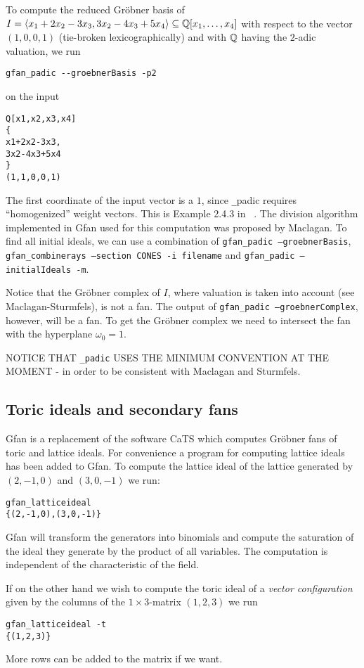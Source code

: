 \begin{example}
To compute the reduced Gr\"obner basis of $I=\langle x_1+2x_2-3x_3, 3x_2-4x_3+5x_4\rangle\subseteq \mathbb{Q}[x_1,\dots,x_4]$ with respect to the vector $(1,0,0,1)$ (tie-broken lexicographically) and with $\mathbb{Q}$ having the $2$-adic valuation,
we run
\begin{verbatim}
gfan_padic --groebnerBasis -p2
\end{verbatim}
on the input
\begin{verbatim}
Q[x1,x2,x3,x4]
{
x1+2x2-3x3,
3x2-4x3+5x4
}
(1,1,0,0,1)
\end{verbatim}
The first coordinate of the input vector is a $1$, since {\texttt \_padic} requires ``homogenized'' weight vectors. This is Example 2.4.3 in ~\cite{tropicalbook}. The division algorithm implemented in Gfan used for this computation was proposed by Maclagan. To find all initial ideals, we can use a combination of \texttt{gfan\_padic --groebnerBasis}, \texttt{gfan\_combinerays --section CONES -i filename} and \texttt{gfan\_padic --initialIdeals -m}.

Notice that the Gr\"obner complex of $I$, where valuation is taken into account (see Maclagan-Sturmfels), is not a fan. The output of \texttt{gfan\_padic --groebnerComplex}, however, will be a fan. To get the Gr\"obner complex we need to intersect the fan with the hyperplane $\omega_0=1$.

NOTICE THAT \texttt{\_padic} USES THE MINIMUM CONVENTION AT THE MOMENT - in order to be consistent with Maclagan and Sturmfels.
\end{example}


\subsection{Toric ideals and secondary fans}

Gfan is a replacement of the software CaTS \cite{cats} which computes Gr\"obner fans of toric and lattice ideals.
For convenience a program for computing lattice ideals has been added to Gfan.
To compute the lattice ideal of the lattice generated by $(2,-1,0)$ and $(3,0,-1)$ we run:
\begin{verbatim}
gfan_latticeideal
{(2,-1,0),(3,0,-1)}
\end{verbatim}
Gfan will transform the generators into binomials and compute the
saturation of the ideal they generate by the product of all variables. The computation is independent of the characteristic of the field.

If on the other hand we wish to compute the toric ideal of a \emph{vector configuration} given by the columns of the $1\times 3$-matrix $(1,2,3)$ we run
\begin{verbatim}
gfan_latticeideal -t
{(1,2,3)}
\end{verbatim}
More rows can be added to the matrix if we want.

